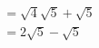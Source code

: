 \documentclass[preview]{standalone}
\begin{document}
\begin{align*}
\quad\\= \sqrt{4}\sqrt{5} + \sqrt{5}\quad\\= 2\sqrt{5} - \sqrt{5}
\end{align*}
\end{document}
